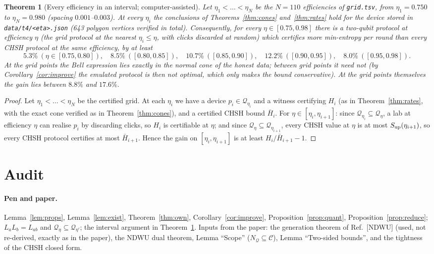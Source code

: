 \documentclass[11pt]{article}
\newtheorem{theorem}{Theorem}
\theoremstyle{definition}\newtheorem{definition}{Definition}
\theoremstyle{remark}\newtheorem{remark}{Remark}
\newcommand{\Q}{\mathcal Q}
\begin{document}
\begin{theorem}[Every efficiency in an interval; computer-assisted]\label{thm:cover}
Let $\eta_1<\dots<\eta_N$ be the $N=110$ efficiencies of \texttt{grid.tsv}, from $\eta_1=0.750$ to $\eta_N=0.980$ (spacing $0.001$--$0.003$). At every $\eta_i$ the conclusions of Theorems~\ref{thm:cones} and~\ref{thm:rates} hold for the device stored in \texttt{data/t4/<eta>.json} (643 polygon vertices verified in total). Consequently, for \emph{every} $\eta\in[0.75,0.98]$ there is a two-qubit protocol at efficiency $\eta$ (the grid protocol at the nearest $\eta_i\le\eta$, with clicks discarded at random) which certifies more min-entropy per round than every CHSH protocol at the same efficiency, by at least
\[
5.3\%\ (\eta\in[0.75,0.80]),\quad 8.5\%\ ([0.80,0.85]),\quad 10.7\%\ ([0.85,0.90]),\quad 12.2\%\ ([0.90,0.95]),\quad 8.0\%\ ([0.95,0.98]).
\]
At the grid points the Bell expression lies exactly in the normal cone of the honest data; between grid points it need not (by Corollary~\ref{cor:improve} the emulated protocol is then not optimal, which only makes the bound conservative). At the grid points themselves the gain lies between $8.8\%$ and $17.6\%$.
\end{theorem}
\begin{proof}
Let $\eta_1<\dots<\eta_N$ be the certified grid. At each $\eta_i$ we have a device $p_i\in\Q_{\eta_i}$ and a witness certifying $H_i$ (as in Theorem~\ref{thm:rates}, with the exact cone verified as in Theorem~\ref{thm:cones}), and a certified CHSH bound $\bar H_i$. For $\eta\in[\eta_i,\eta_{i+1}]$: since $\Q_{\eta_i}\subseteq\Q_\eta$, a lab at efficiency $\eta$ can realise $p_i$ by discarding clicks, so $H_i$ is certifiable at $\eta$; and since $\Q_\eta\subseteq\Q_{\eta_{i+1}}$, every CHSH value at $\eta$ is at most $S_{\rm up}(\eta_{i+1})$, so every CHSH protocol certifies at most $\bar H_{i+1}$. Hence the gain on $[\eta_i,\eta_{i+1}]$ is at least $H_i/\bar H_{i+1}-1$.
\end{proof}

\section{Audit}
\paragraph{Pen and paper.} Lemma~\ref{lem:props}, Lemma~\ref{lem:exist}, Theorem~\ref{thm:own}, Corollary~\ref{cor:improve}, Proposition~\ref{prop:quant}, Proposition~\ref{prop:reduce}; $L_aL_b=L_{ab}$ and $\Q_\eta\subseteq\Q_{\eta'}$; the interval argument in Theorem~\ref{thm:cover}. Inputs from the paper: the generation theorem of Ref.~[NDWU] (used, not re-derived, exactly as in the paper), the NDWU dual theorem, Lemma ``Scope'' ($N_\Q\subseteq\mathcal C$), Lemma ``Two-sided bounds'', and the tightness of the CHSH closed form.
\end{document}
